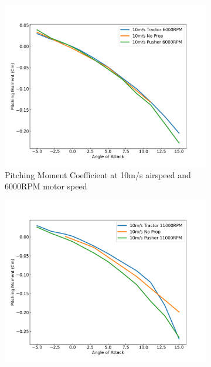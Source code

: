 \begin{figure}[H]
    \centering
    \begin{subfigure}[b]{0.467\textwidth}
        \centering
        \includegraphics[width=\textwidth]{05_Results/Figs/Cm/10ms_6000RPM_Cm.png}
        \caption{Pitching Moment Coefficient at 10m/s airspeed and 6000RPM motor speed}
        \label{fig:Cm_10ms_6000}
    \end{subfigure}
    \begin{subfigure}[b]{0.467\textwidth}
        \centering
        \includegraphics[width=\textwidth]{05_Results/Figs/Cm/10ms_11000RPM_Cm.png}

\end{subfigure}
\end{figure}
